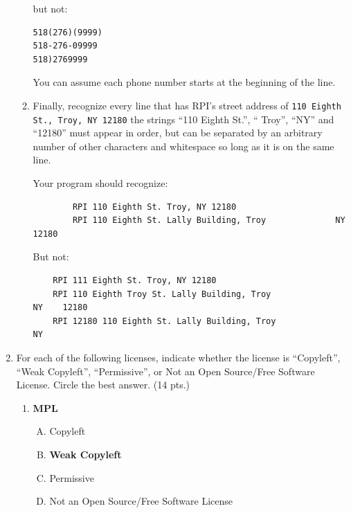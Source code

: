 \documentclass[10pt]{article}
\begin{document}
\begin{enumerate}
\begin{enumerate}[a]
but not:

\begin{verbatim}
518(276)(9999)
518-276-09999
518)2769999		
\end{verbatim}

You can assume each phone number starts at the beginning of the line.
		
		\bigskip
		\bigskip
	\bigskip
	\bigskip
		\bigskip
	\bigskip
	\bigskip
		\bigskip
		\bigskip
		
		\newpage
		
		\item Finally, recognize every line that has RPI's street address of \verb|110 Eighth St., Troy, NY 12180| the strings ``110 Eighth St.'', `` Troy'', ``NY'' and ``12180'' must appear in order, but can be separated by an arbitrary number of other characters and whitespace so long as it is on the same line.
		
		Your program should recognize:
		
		\begin{verbatim}
		RPI 110 Eighth St. Troy, NY 12180
		RPI 110 Eighth St. Lally Building, Troy              NY    12180
		\end{verbatim}
	
	But not:
	
		\begin{verbatim}
	RPI 111 Eighth St. Troy, NY 12180
	RPI 110 Eighth Troy St. Lally Building, Troy              NY    12180
	RPI 12180 110 Eighth St. Lally Building, Troy              NY 
\end{verbatim}

	
		
		\bigskip
		\bigskip
	\bigskip
\bigskip
\bigskip
	\bigskip
\bigskip
\bigskip
		\bigskip
			\end{enumerate}
		\fi
	
\newpage


	\item For each of the following licenses, indicate whether the license is ``Copyleft'', ``Weak Copyleft'', ``Permissive'', or Not an Open Source/Free Software License. Circle the best answer. (14 pts.)
	 	
\beginanswers
\begin{enumerate}[a]
	\item \textbf{MPL}

\begin{enumerate}[A.]
	\item Copyleft
	\item \textbf{Weak Copyleft}
	\item Permissive
	\item Not an Open Source/Free Software License
\end{enumerate}


\end{enumerate}
\end{enumerate}
\end{document}
